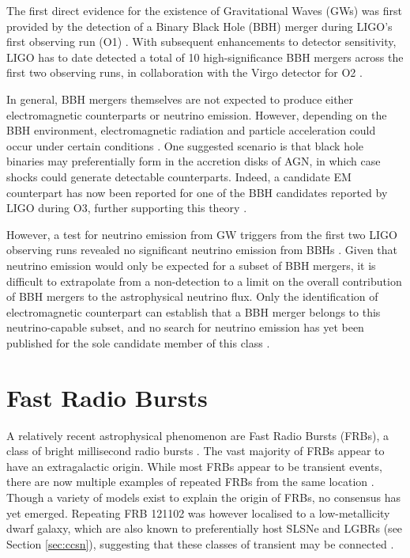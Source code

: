 The first direct evidence for the existence of Gravitational Waves (GWs) was first provided by the detection of a Binary Black Hole (BBH) merger during LIGO's first observing run (O1) . With subsequent enhancements to detector sensitivity,  LIGO has to date detected a total of 10 high-significance BBH mergers across the first two observing runs, in collaboration with the Virgo detector for O2 . 

In general, BBH mergers themselves are not expected to produce either electromagnetic counterparts or neutrino emission. However, depending on the BBH environment, electromagnetic radiation and particle acceleration could occur under certain conditions . One suggested scenario is that black hole binaries may preferentially form in the accretion disks of AGN, in which case shocks could generate detectable counterparts. Indeed, a candidate EM counterpart has now been reported for one of the BBH candidates reported by LIGO during O3, further supporting this theory .

However, a test for neutrino emission from GW triggers from the first two LIGO observing runs revealed no significant neutrino emission from BBHs . Given that neutrino emission would only be expected for a subset of BBH mergers, it is difficult to extrapolate from a non-detection to a limit on the overall contribution of BBH mergers to the astrophysical neutrino flux. Only the identification of electromagnetic counterpart can establish that a BBH merger belongs to this neutrino-capable subset, and no search for neutrino emission has yet been published for the sole candidate member of this class \cite{graham_gw_20}.

\section{Fast Radio Bursts}

A relatively recent astrophysical phenomenon are Fast Radio Bursts (FRBs), a class of bright millisecond radio bursts . The vast majority of FRBs appear to have an extragalactic origin. While most FRBs appear to be transient events, there are now multiple examples of repeated FRBs from the same location . Though a variety of models exist to explain the origin of FRBs, no consensus has yet emerged. Repeating FRB 121102 was however localised to a low-metallicity dwarf galaxy, which are also known to preferentially host SLSNe and LGBRs (see Section \ref{sec:ccsn}), suggesting that these classes of transient may be connected . 

